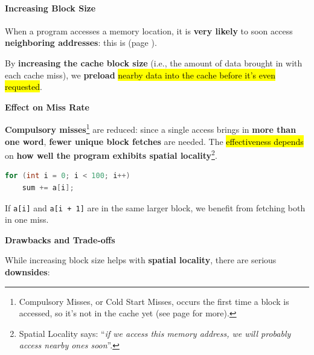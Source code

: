\paragraph{Increasing Block Size}

When a program accesses a memory location, it is \textbf{very likely} to soon access \textbf{neighboring addresses}: this is  (page \pageref{def: Spatial Locality}).

\highspace
By \textbf{increasing the cache block size} (i.e., the amount of data brought in with each cache miss), we \textbf{preload} \hl{nearby data into the cache before it's even requested}.

\highspace
\begin{flushleft}
    \textcolor{Green3}{\faIcon{\speedIcon} \textbf{Effect on Miss Rate}}
\end{flushleft}
\textbf{Compulsory misses}\footnote{Compulsory Misses, or Cold Start Misses, occurs the first time a block is accessed, so it's not in the cache yet (see page \pageref{def: Compulsory Misses} for more).} are reduced: since a single access brings in \textbf{more than one word}, \textbf{fewer unique block fetches} are needed. The \hl{effectiveness depends} on \textbf{how well the program exhibits spatial locality}\footnote{Spatial Locality says: ``\emph{if we access this memory address, we will probably access nearby ones soon}''.}.

\highspace
\begin{examplebox}
    \begin{lstlisting}[language=c]
for (int i = 0; i < 100; i++)
    sum += a[i];\end{lstlisting}
    If \texttt{a[i]} and \texttt{a[i + 1]} are in the same larger block, we benefit from fetching both in one miss.
\end{examplebox}

\highspace
\begin{flushleft}
    \textcolor{Red2}{ \textbf{Drawbacks and Trade-offs}}
\end{flushleft}
While increasing block size helps with \textbf{spatial locality}, there are serious \textbf{downsides}:

